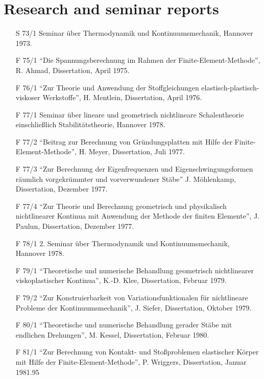 \fancyhf{}
\cfoot{\thepage}

\chapter*{Research and seminar reports}

\begin{itemize}
    \item[S 73/1] Seminar über Thermodynamik und Kontinuumsmechanik, Hannover 1973.
    \item[F 75/1] ``Die Spannungsberechnung im Rahmen der Finite-Element-Methode”, R. Ahmad, Dissertation, April 1975.
    \item[F 76/1] ``Zur Theorie und Anwendung der Stoffgleichungen elastisch-plastisch- viskoser Werkstoffe”, H. Mentlein, Dissertation, April 1976.
    \item[F 77/1] Seminar über lineare und geometrisch nichtlineare Schalentheorie einschließlich Stabilit\"atstheorie, Hannover 1978.
    \item[F 77/2] ``Beitrag zur Berechnung von Gründungsplatten mit Hilfe der Finite- Element-Methode”, H. Meyer, Dissertation, Juli 1977.
    \item[F 77/3] ``Zur Berechnung der Eigenfrequenzen und Eigenschwingungsformen räumlich vorgekrümmter und vorverwundener Stäbe” J. M\"ohlenkamp, Dissertation, Dezember 1977.
    \item[F 77/4] ``Zur Theorie und Berechnung geometrisch und physikalisch nichtlinearer Kontinua mit Anwendung der Methode der finiten Elemente”, J. Paulun, Dissertation, Dezember 1977.
    \item[F 78/1] 2. Seminar über Thermodynamik und Kontinuumsmechanik, Hannover 1978.
    \item[F 79/1] ``Theoretische und numerische Behandlung geometrisch nichtlinearer viskoplastischer Kontinua”, K.-D. Klee, Dissertation, Februar 1979.
    \item[F 79/2] ``Zur Konstruierbarkeit von Variationsfunktionalen für nichtlineare Probleme der Kontinuumsmechanik”, J. Siefer, Dissertation, Oktober 1979.
    \item[F 80/1] ``Theoretische und numerische Behandlung gerader Stäbe mit endlichen Drehungen”, M. Kessel, Dissertation, Februar 1980.
    \item[F 81/1] ``Zur Berechnung von Kontakt- und Stoßproblemen elastischer Körper mit Hilfe der Finite-Element-Methode”, P. Wriggers, Dissertation, Januar 1981.95

\end{itemize}
